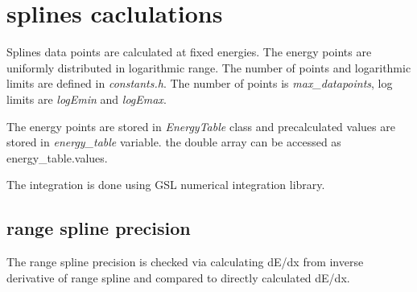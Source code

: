 \documentclass[12pt,a4paper]{article}
\begin{document}
\section{splines caclulations}
Splines data points are calculated at fixed energies. The energy points are uniformly distributed in logarithmic range.
The number of points and logarithmic limits are defined in \textit{constants.h}.
The number of points is \textit{max\_datapoints}, log limits are \textit{logEmin} and \textit{logEmax}.


The energy points are stored in \textit{EnergyTable} class and precalculated values are stored in \textit{energy\_table} variable.
the double array can be accessed as energy\_table.values.

The integration is done using GSL numerical integration library.

\subsection{range spline precision}
The range spline precision is checked via calculating dE/dx from inverse derivative of range spline and compared to directly calculated dE/dx.
\end{document}
